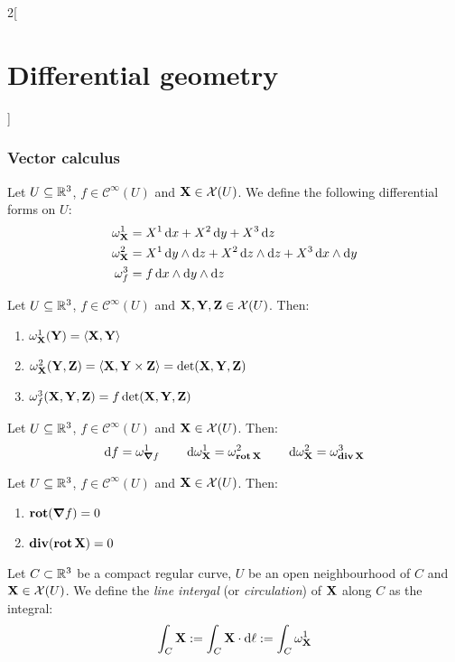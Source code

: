 \documentclass[../../../main.tex]{subfiles}
\begin{document}
\begin{multicols}{2}[\section{Differential geometry}]
  \subsubsection{Vector calculus}
  \begin{definition}
    Let $U\subseteq\mathbb{R}^3$, $f\in\mathcal{C}^\infty(U)$ and $\boldsymbol{\mathrm{X}}\in\mathcal{X}(U)$. We define the following differential forms on $U$:
    \begin{align*}
      \omega_{\boldsymbol{\mathrm{X}}}^1 & =X^1\dd{x}+X^2\dd{y}+X^3\dd{z}                                     \\
      \omega_{\boldsymbol{\mathrm{X}}}^2 & =X^1\dd{y}\wedge\dd{z}+X^2\dd{z}\wedge\dd{z}+X^3\dd{x}\wedge\dd{y} \\
      \omega_{f}^3      & =f\dd{x}\wedge\dd{y}\wedge\dd{z}
    \end{align*}
  \end{definition}
  \begin{lemma}
    Let $U\subseteq\mathbb{R}^3$, $f\in\mathcal{C}^\infty(U)$ and $\boldsymbol{\mathrm{X}},\boldsymbol{\mathrm{Y}},\boldsymbol{\mathrm{Z}}\in\mathcal{X}(U)$. Then:
    \begin{enumerate}
      \item $\omega_{\boldsymbol{\mathrm{X}}}^1(\boldsymbol{\mathrm{Y}})=\langle\boldsymbol{\mathrm{X}},\boldsymbol{\mathrm{Y}}\rangle$
      \item $\omega_{\boldsymbol{\mathrm{X}}}^2(\boldsymbol{\mathrm{Y}},\boldsymbol{\mathrm{Z}})=\langle\boldsymbol{\mathrm{X}},\boldsymbol{\mathrm{Y}}\times\boldsymbol{\mathrm{Z}}\rangle=\det(\boldsymbol{\mathrm{X}},\boldsymbol{\mathrm{Y}},\boldsymbol{\mathrm{Z}})$
      \item $\omega_{f}^3(\boldsymbol{\mathrm{X}},\boldsymbol{\mathrm{Y}},\boldsymbol{\mathrm{Z}})=f\det(\boldsymbol{\mathrm{X}},\boldsymbol{\mathrm{Y}},\boldsymbol{\mathrm{Z}})$
    \end{enumerate}
  \end{lemma}
  \begin{proposition}
    Let $U\subseteq\mathbb{R}^3$, $f\in\mathcal{C}^\infty(U)$ and $\boldsymbol{\mathrm{X}}\in\mathcal{X}(U)$. Then:
    $$\dd{f}=\omega_{\grad{f}}^1\qquad\dd{\omega_{\boldsymbol{\mathrm{X}}}^1}=\omega_{\operatorname{\boldsymbol{\mathrm{rot}}}{\boldsymbol{\mathrm{X}}}}^2\qquad\dd{\omega_{\boldsymbol{\mathrm{X}}}^2}=\omega_{\operatorname{\boldsymbol{\mathrm{div}}}{\boldsymbol{\mathrm{X}}}}^3$$
  \end{proposition}
  \begin{corollary}
    Let $U\subseteq\mathbb{R}^3$, $f\in\mathcal{C}^\infty(U)$ and $\boldsymbol{\mathrm{X}}\in\mathcal{X}(U)$. Then:
    \begin{enumerate}
      \item $\operatorname{\boldsymbol{\mathrm{rot}}}(\grad f)=0$
      \item $\operatorname{\boldsymbol{\mathrm{div}}}(\operatorname{\boldsymbol{\mathrm{rot}}}\boldsymbol{\mathrm{X}})=0$
    \end{enumerate}
  \end{corollary}
  \begin{definition}
    Let $C\subset \mathbb{R}^3$ be a compact regular curve, $U$ be an open neighbourhood of $C$ and $\boldsymbol{\mathrm{X}}\in\mathcal{X}(U)$. We define the \emph{line intergal} (or \emph{circulation}) of $\boldsymbol{\mathrm{X}}$ along $C$ as the integral: $$\int_C\boldsymbol{\mathrm{X}}:=\int_C\boldsymbol{\mathrm{X}}\cdot\dd{\ell}:=\int_C\omega_{\boldsymbol{\mathrm{X}}}^1$$

\end{definition}
\end{multicols}
\end{document}
